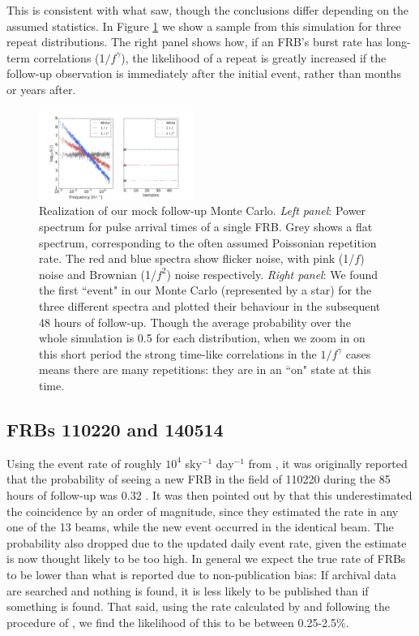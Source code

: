 \documentclass[useAMS,usenatbib]{mn2e}
\begin{document}
This is consistent with what \cite{2015MNRAS.454..457P} saw, though the 
conclusions differ depending on the assumed statistics. In Figure \ref{FIG-RATE}
we show a sample from this simulation for three repeat distributions. The right panel 
shows how, if an FRB's burst rate has long-term correlations (1$/f^\gamma$), 
the likelihood of a repeat is greatly increased if the follow-up observation is 
immediately after the initial event, rather than months or years after. 


\begin{figure}
  \centering
   \includegraphics[trim={1in, 0in, 1in, 0in}, width=0.45\textwidth, height=0.29\textwidth]{frb_sim_pink24.png}
   \caption{Realization of our mock follow-up Monte Carlo. \textit{Left panel}: Power spectrum for pulse arrival times of a single FRB.
   Grey shows a flat spectrum, corresponding to the often assumed Poissonian 
   repetition rate. The red and blue spectra show flicker noise, with pink (1/$f$) 
   noise and Brownian (1/$f^2$) noise respectively. \textit{Right panel}: 
   We found the first ``event" in our Monte Carlo (represented by a star) for the three different spectra 
   and plotted their behaviour in the subsequent 48 hours of follow-up. Though the average
   probability over the whole simulation is 0.5 for each distribution, when we zoom in 
   on this short period the strong time-like correlations 
   in the $1/f^\gamma$ cases means there are many repetitions: they are in an ``on" state at this time.}
   \label{FIG-RATE}
\end{figure}


\subsection{FRBs 110220 and 140514}
Using the event rate of roughly $10^4$ sky$^{-1}$ day$^{-1}$
from \cite{2013Sci...341...53T}, it 
was originally reported that the probability of seeing a 
new FRB in the field of 110220 during the 85 hours of follow-up 
was $0.32$  
\citep{2015MNRAS.447..246P}. It was then pointed out by \cite{2015arXiv150701002M} 
that this underestimated the coincidence by an order of magnitude, 
since they estimated the rate in any one of the 13 beams, 
while the new event occurred in the identical beam.
The probability also dropped due to the updated daily event rate,
given the \cite{2013Sci...341...53T} estimate is now thought likely to be too high. 
In general we expect the true rate of FRBs to be lower than what is 
reported due to non-publication bias: If archival data are searched and 
nothing is found, it is less likely to be published than if something is found. 
That said, using the rate calculated by \cite{2015arXiv150500834R} and following
the procedure of \cite{2015arXiv150701002M}, we find the likelihood of this to be 
between 0.25-2.5$\%$.
\end{document}

